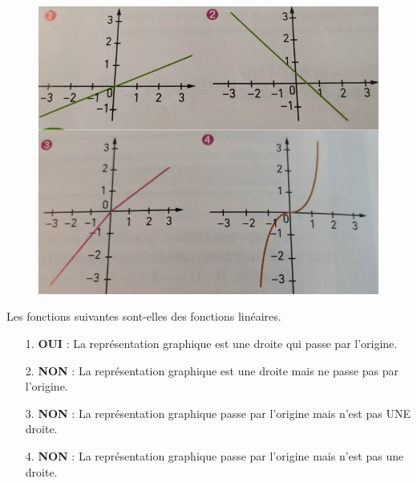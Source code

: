 \documentclass[11pt]{article}
\begin{document}
 \\
\begin{minipage}[t]{0.3\textwidth}
  \begin{figure}[H]
        \centering
        \includegraphics[width=0.9\linewidth]{_continuite/sources/s1-p122ex4.png}
  \end{figure}
\end{minipage}
\begin{minipage}[t]{0.7\textwidth}
Les fonctions suivantes sont-elles des fonctions linéaires.
\begin{enumerate}
    \item[1.] \textbf{OUI} : La représentation graphique est une droite qui passe par l'origine.
    \item[2.] \textbf{NON} : La représentation graphique est une droite mais ne passe pas par l'origine.
    \item[3.] \textbf{NON} : La représentation graphique passe par l'origine mais n'est pas UNE droite.
    \item[4.] \textbf{NON} : La représentation graphique passe par l'origine mais n'est pas une droite.
\end{enumerate}
\end{minipage}

\newpage
{} \\
\end{document}
